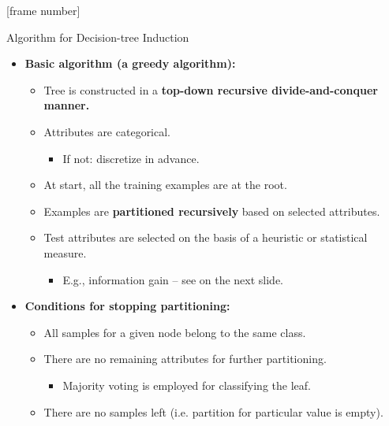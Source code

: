 \documentclass[aspectratio=169,t,table]{beamer}
\begin{document}
  {
    [frame number]
    \begin{frame}{Algorithm for Decision-tree Induction}
        \begin{itemize}
            \item \textbf{Basic algorithm (a greedy algorithm):}
            \begin{itemize}
              \item Tree is constructed in a \textbf{\color{airforceblue}top-down recursive divide-and-conquer manner.}
              \item Attributes are categorical.
              \begin{itemize}
                \item If not: discretize in advance.
              \end{itemize}
              \item At start, all the training examples are at the root.
              \item Examples are \textbf{\color{airforceblue}partitioned recursively} based on selected attributes.
              \item Test attributes are selected on the basis of a heuristic or statistical measure.
              \begin{itemize}
                \item E.g., information gain -- see on the next slide.
              \end{itemize}
            \end{itemize}
            \item \textbf{Conditions for stopping partitioning:}
            \begin{itemize}
              \item All samples for a given node belong to the same class.
              \item There are no remaining attributes for further partitioning.
              \begin{itemize}
                \item Majority voting is employed for classifying the leaf.
              \end{itemize}
              \item There are no samples left (i.e. partition for particular value is empty).
            \end{itemize}
        \end{itemize}
    \end{frame}
  }
\end{document}
